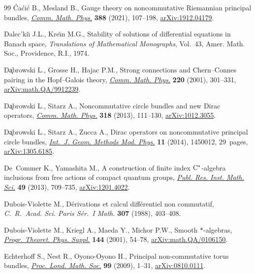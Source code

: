 \documentclass[pdftex]{sigma}
\numberwithin{equation}{section}
\begin{document}
\begin{thebibliography}{99}
\'Ca\'ci\'c B., Mesland B., Gauge theory on noncommutative {R}iemannian
 principal bundles, \href{https://doi.org/10.1007/s00220-021-04187-8}{\textit{Comm. Math. Phys.}} \textbf{388} (2021), 107--198,
 \href{https://arxiv.org/abs/1912.04179}{arXiv:1912.04179}.

Dalec'ki\u{\i} J.L., Kre\u{\i}n M.G., Stability of solutions of differential
 equations in {B}anach space, \textit{Translations of Mathematical
 Monographs}, Vol.~43, Amer. Math. Soc., Providence, R.I., 1974.

D\c{a}browski L., Grosse H., Hajac P.M., Strong connections and
 {C}hern--{C}onnes pairing in the {H}opf--{G}alois theory, \href{https://doi.org/10.1007/s002200100433}{\textit{Comm. Math.
 Phys.}} \textbf{220} (2001), 301--331, \href{https://arxiv.org/abs/math.QA/9912239}{arXiv:math.QA/9912239}.

D\c{a}browski L., Sitarz A., Noncommutative circle bundles and new {D}irac
 operators, \href{https://doi.org/10.1007/s00220-012-1550-8}{\textit{Comm. Math. Phys.}} \textbf{318} (2013), 111--130,
 \href{https://arxiv.org/abs/1012.3055}{arXiv:1012.3055}.

D\c{a}browski L., Sitarz A., Zucca A., Dirac operators on noncommutative
 principal circle bundles, \href{https://doi.org/10.1142/S0219887814500121}{\textit{Int.~J. Geom. Methods Mod. Phys.}}
 \textbf{11} (2014), 1450012, 29~pages, \href{https://arxiv.org/abs/1305.6185}{arXiv:1305.6185}.

De~Commer K., Yamashita M., A construction of finite index {${\rm
 C}^*$}-algebra inclusions from free actions of compact quantum groups,
 \href{https://doi.org/10.4171/PRIMS/117}{\textit{Publ. Res. Inst. Math. Sci.}} \textbf{49} (2013), 709--735,
 \href{https://arxiv.org/abs/1201.4022}{arXiv:1201.4022}.

Dubois-Violette M., D\'erivations et calcul diff\'erentiel non commutatif,
 \textit{C.~R.~Acad. Sci. Paris S\'er.~I Math.} \textbf{307} (1988), 403--408.

Dubois-Violette M., Kriegl A., Maeda Y., Michor P.W., Smooth {$*$}-algebras,
 \href{https://doi.org/10.1143/PTPS.144.54}{\textit{Progr. Theoret. Phys. Suppl.}} \textbf{144} (2001), 54--78,
 \href{https://arxiv.org/abs/math.QA/0106150}{arXiv:math.QA/0106150}.

Echterhoff S., Nest R., Oyono-Oyono H., Principal non-commutative torus
 bundles, \href{https://doi.org/10.1112/plms/pdn050}{\textit{Proc. Lond. Math. Soc.}} \textbf{99} (2009), 1--31,
 \href{https://arxiv.org/abs/0810.0111}{arXiv:0810.0111}.


\end{thebibliography}
\end{document}
